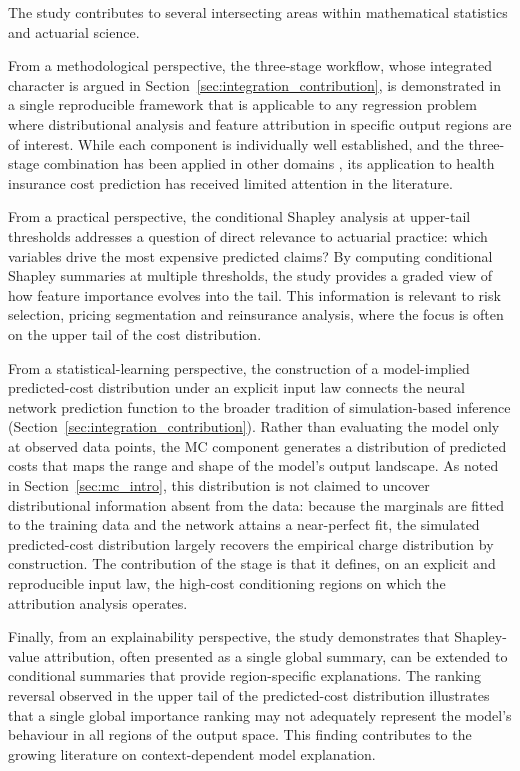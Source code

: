 The study contributes to several intersecting areas within mathematical
statistics and actuarial science.

From a methodological perspective, the three-stage workflow, whose
integrated character is argued in
Section~\ref{sec:integration_contribution}, is demonstrated in a single
reproducible framework that is applicable to any regression problem
where distributional analysis and feature attribution in specific
output regions are of interest.  While each component is individually well established, and the
three-stage combination has been applied in other domains
\citep{santos2023explainable}, its application to health insurance cost
prediction has received limited attention in the literature.

From a practical perspective, the conditional Shapley analysis at
upper-tail thresholds addresses a question of direct relevance to
actuarial practice: which variables drive the most expensive predicted
claims?  By computing conditional Shapley
summaries at multiple thresholds, the study provides a graded view of
how feature importance evolves into the tail.  This information is
relevant to risk selection, pricing segmentation and reinsurance
analysis, where the focus is often on the upper tail of the cost
distribution.

From a statistical-learning perspective, the construction of a
model-implied predicted-cost distribution under an explicit input law
connects the neural network prediction function to the broader tradition
of simulation-based inference (Section~\ref{sec:integration_contribution}).
Rather than evaluating the model only at observed data points, the MC
component generates a distribution of predicted costs that maps the range
and shape of the model's output landscape.  As noted in
Section~\ref{sec:mc_intro}, this distribution is not claimed to uncover
distributional information absent from the data: because the marginals are
fitted to the training data and the network attains a near-perfect fit,
the simulated predicted-cost distribution largely recovers the empirical
charge distribution by construction.  The contribution of the stage is
that it defines, on an explicit and reproducible input law, the high-cost
conditioning regions on which the attribution analysis operates.

Finally, from an explainability perspective, the study demonstrates that
Shapley-value attribution, often presented as a single global summary,
can be extended to conditional summaries that provide region-specific
explanations.  The ranking reversal observed in the upper tail of the
predicted-cost distribution illustrates that a single global importance
ranking may not adequately represent the model's behaviour in all
regions of the output space.  This finding contributes to the growing
literature on context-dependent model explanation.

